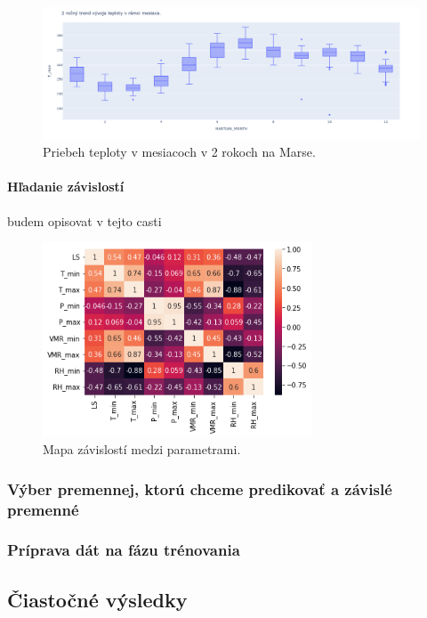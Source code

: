 \begin{figure}[!htbp]
  \centering
  \includegraphics[width=16cm]{img/monthly_temp.png}
  \caption{Priebeh teploty v mesiacoch v 2 rokoch na Marse.}
  \label{dfdesc}
\end{figure}

\paragraph{Hľadanie závislostí} budem opisovat v tejto casti
\begin{figure}[!htbp]
  \centering
  \includegraphics[width=8cm]{img/heatmap.png}
  \caption{Mapa závislostí medzi parametrami.}
  \label{heatmap}
\end{figure}




\newpage

\subsubsection{Výber premennej, ktorú chceme predikovať a závislé premenné}
\subsubsection{Príprava dát na fázu trénovania}

\subsection{Čiastočné výsledky}

